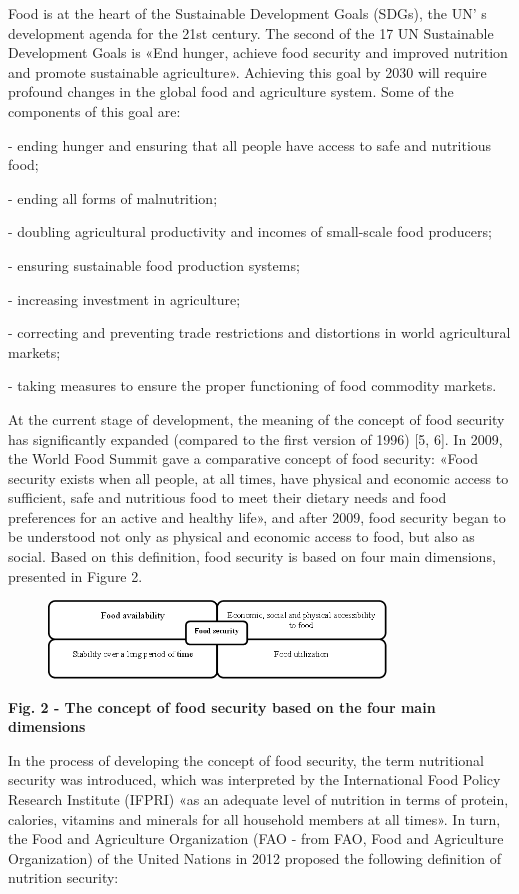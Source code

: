 {Food is at the heart of the Sustainable Development Goals (SDGs), the
UN' s development agenda for the 21st century. The second
of the 17 UN Sustainable Development Goals is «End hunger, achieve food
security and improved nutrition and promote sustainable agriculture».
Achieving this goal by 2030 will require profound changes in the global
food and agriculture system. Some of the components of this goal are:

- ending hunger and ensuring that all people have access to safe and
nutritious food;

- ending all forms of malnutrition;

- doubling agricultural productivity and incomes of small-scale food
producers;

- ensuring sustainable food production systems;

- increasing investment in agriculture;

- correcting and preventing trade restrictions and distortions in world
agricultural markets;

- taking measures to ensure the proper functioning of food commodity
markets.

At the current stage of development, the meaning of the concept of food
security has significantly expanded (compared to the first version of
1996) {[}5, 6{]}. In 2009, the World Food Summit gave a comparative
concept of food security: «Food security exists when all people, at all
times, have physical and economic access to sufficient, safe and
nutritious food to meet their dietary needs and food preferences for an
active and healthy life», and after 2009, food security began to be
understood not only as physical and economic access to food, but also as
social. Based on this definition, food security is based on four main
dimensions, presented in Figure 2.

\begin{figure}[H]
	\centering
	\includegraphics[width=0.8\textwidth]{media/ekon3/image2}
	\caption*{}
\end{figure}


{\bfseries Fig. 2 - The concept of food security based on the four main
dimensions}

In the process of developing the concept of food security, the term
nutritional security was introduced, which was interpreted by the
International Food Policy Research Institute (IFPRI) «as an adequate
level of nutrition in terms of protein, calories, vitamins and minerals
for all household members at all times». In turn, the Food and
Agriculture Organization (FAO - from FAO, Food and Agriculture
Organization) of the United Nations in 2012 proposed the following
definition of nutrition security:

}
